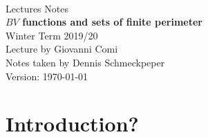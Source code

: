 \documentclass[ngerman]{report}
\begin{document}
\begin{titlepage}
  \centering\text{}\\[14ex]
  \Huge Lectures Notes\\[2ex]
  \Huge {\bf $BV$ functions and sets of finite perimeter}\\[18ex]
  \LARGE Winter Term 2019/20\\[22ex]
  Lecture by Giovanni Comi\\[2ex]
  Notes taken by Dennis Schmeckpeper\\[8ex]
  \Large Version: \today\\
\end{titlepage}
\tableofcontents
\chapter{Introduction?}

\end{document}
